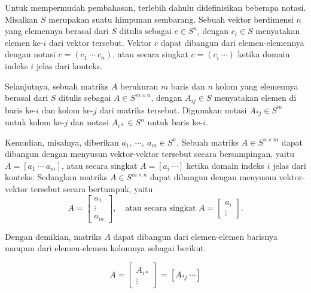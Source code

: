 \documentclass[10pt,twocolumn]{article}
\begin{document}
Untuk mempermudah pembahasan, terlebih dahulu didefinisikan beberapa notasi. Misalkan \(S\) merupakan suatu himpunan sembarang. Sebuah vektor berdimensi \(n\) yang elemennya berasal dari \(S\) ditulis sebagai \(c \in S^n\), dengan \(c_i \in S\) menyatakan elemen ke-\(i\) dari vektor tersebut. Vektor \(c\) dapat dibangun dari elemen-elemennya dengan notasi \(c = (c_1\ \cdots\ c_n)\), atau secara singkat \(c = (c_i\ \cdots)\) ketika domain indeks \(i\) jelas dari konteks.

Selanjutnya, sebuah matriks \(A\) berukuran \(m\) baris dan \(n\) kolom yang elemennya berasal dari \(S\) ditulis sebagai \(A \in S^{m\times n}\), dengan \(A_{ij} \in S\) menyatakan elemen di baris ke-\(i\) dan kolom ke-\(j\) dari matriks tersebut. Digunakan notasi \(A_{*j} \in S^m\) untuk kolom ke-\(j\) dan notasi \(A_{i*} \in S^n\) untuk baris ke-\(i\).

Kemudian, misalnya, diberikan \(a_1,\ \cdots,\ a_m \in S^n\). Sebuah matriks \(A \in S^{n\times m}\) dapat dibangun dengan menyusun vektor-vektor tersebut secara bersampingan, yaitu \(A = [a_1\ \cdots\ a_m]\), atau secara singkat \(A = [a_i\ \cdots]\) ketika domain indeks \(i\) jelas dari konteks. Sedangkan matriks \(A \in S^{m\times n}\) dapat dibangun dengan menyusun vektor-vektor tersebut secara bertumpuk, yaitu
	\[ A = \left[ \begin{array}{c} a_1\\ \vdots\\ a_m \end{array} \right], \quad \text{atau secara singkat } A = \left[ \begin{array}{c} a_i\\ \vdots \end{array} \right] \text{.}\]

Dengan demikian, matriks \(A\) dapat dibangun dari elemen-elemen barisnya maupun dari elemen-elemen kolomnya sebagai berikut.

	\[ A = \left[ \begin{array}{c} A_{i*}\\ \vdots \end{array} \right] = [A_{*j}\ \cdots] \]
\end{document}
